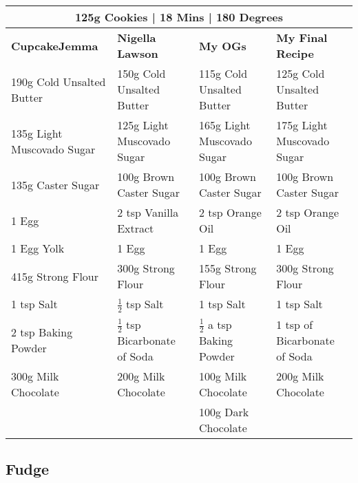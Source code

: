 \documentclass[11pt, english]{article}
\begin{document}
	\begin{table}[h]
	        \scriptsize
	\begin{center}
	\begin{tabular}{p{3.5cm}p{3.5cm}p{3.5cm}p{3.5cm}}
	        \multicolumn{4}{c}{125g Cookies | 18 Mins | 180 Degrees}\\
	        \hline
	        \textbf{CupcakeJemma} & \textbf{Nigella Lawson} & \textbf{My OGs} & \textbf{My Final Recipe}\\
	        \hline
	        190g Cold Unsalted Butter & 150g Cold Unsalted Butter & 115g Cold Unsalted Butter & 125g Cold Unsalted Butter\\
	        135g Light Muscovado Sugar & 125g Light Muscovado Sugar & 165g Light Muscovado Sugar & 175g Light Muscovado Sugar\\
	        135g Caster Sugar & 100g Brown Caster Sugar & 100g Brown Caster Sugar & 100g Brown Caster Sugar\\
	        1 Egg & 2 tsp Vanilla Extract & 2 tsp Orange Oil & 2 tsp Orange Oil\\
	        1 Egg Yolk & 1 Egg & 1 Egg & 1 Egg\\
	        415g Strong Flour & 300g Strong Flour & 155g Strong Flour & 300g Strong Flour\\
	        1 tsp Salt & $\frac{1}{2}$ tsp Salt & 1 tsp Salt & 1 tsp Salt\\
	        2 tsp Baking Powder & $\frac{1}{2}$ tsp Bicarbonate of Soda & $\frac{1}{2}$ a tsp Baking Powder & 1 tsp of Bicarbonate of Soda\\
	        300g Milk Chocolate & 200g Milk Chocolate & 100g Milk Chocolate & 200g Milk Chocolate\\
	        & & 100g Dark Chocolate & \\
	        \hline
	\end{tabular}
	\end{center}
	\end{table}

\newpage

	\subsection{Fudge}
\end{document}
